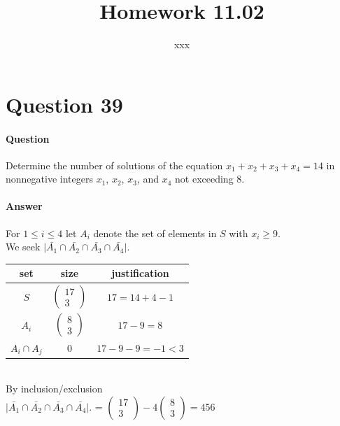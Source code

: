 \documentclass[UTF8]{article}
\title{Homework 11.02}
\author{xxx}
\date{}
\begin{document}
    \maketitle
    \section{Question 39}
    \paragraph{Question}
    Determine the number of solutions of the equation $ x_{1} + x_{2} + x_{3} + x_{4} = 14 $ in nonnegative integers $ x_{1} $, $ x_{2} $, $ x_{3} $, and $ x_{4} $ not exceeding 8.
    \paragraph{Answer}
    \begin{center}
        For $ 1 \leq i \leq 4 $ let $ A_{i} $ denote the set of elements in $S$ with $x_{i} \geq 9$. \\
        We seek $\vert \bar{A_{1}} \cap \bar{A_{2}} \cap \bar{A_{3}} \cap \bar{A_{4}}\vert. $ \\
        \vspace{6pt}
        \begin{tabular}{c|c|c}
            \toprule
            set & size & justification\\
            \midrule
            $S$ & $\begin{pmatrix} 17 \\ 3 \end{pmatrix}$ & $17 = 14 + 4 - 1$\\
            $A_{i}$ & $\begin{pmatrix} 8 \\ 3 \end{pmatrix}$ & $17 - 9 = 8$\\
            $A_{i} \cap A_{j}$ & $ 0 $ & $17 - 9 - 9 = -1 < 3$\\
            \bottomrule
        \end{tabular} \\
        By inclusion/exclusion \\
        $\vert \bar{A_{1}} \cap \bar{A_{2}} \cap \bar{A_{3}} \cap \bar{A_{4}}\vert. $ = $\begin{pmatrix} 17 \\ 3 \end{pmatrix} - 4\begin{pmatrix} 8 \\ 3 \end{pmatrix} = 456$
    \end{center}
\end{document}
